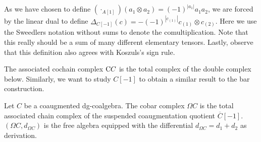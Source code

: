 \documentclass[../thesis.tex]{subfiles}
\begin{document}
            \begin{remark}
                As we have chosen to define $(\cdot_{A[1]})(a_1\otimes a_2)=(-1)^{|a_1|}a_1a_2$, we are forced by the linear dual to define $\Delta_{C[-1]}(c)=-(-1)^{|c_{(1)}|}c_{(1)}\otimes c_{(2)}$. Here we use the Sweedlers notation without sums to denote the comultiplication. Note that this really should be a sum of many different elementary tensors. Lastly, observe that this definition also agrees with Koszuls's sign rule.
            \end{remark}

            The associated cochain complex $\tt{C}C$ is the total complex of the double complex below. Similarly, we want to study $C[-1]$ to obtain a similar result to the bar construction.

            \begin{center}
            \end{center}

            \begin{proposition}
                Let $C$ be a coaugmented dg-coalgebra. The cobar complex $\Omega C$ is the total associated chain complex of the suspended coaugmentation quotient $\overline{C}[-1]$. $(\Omega C, d_{\Omega C})$ is the free algebra equipped with the differential $d_{\Omega C} = d_1 + d_2$ as derivation.
            \end{proposition}
\end{document}
